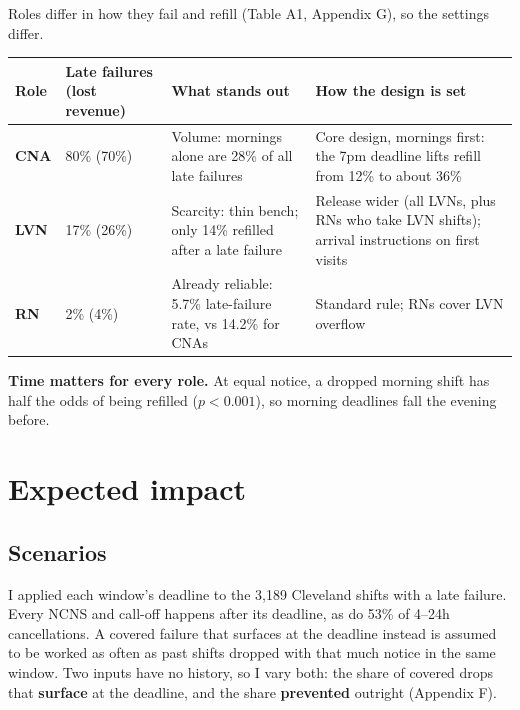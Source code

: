 \documentclass[11pt]{article}
\begin{document}
Roles differ in how they fail and refill (Table A1, Appendix G), so the settings differ.

\begin{center}\small
{}
\begin{tabularx}{\textwidth}{@{}lR{2.0cm}LL@{}}
\toprule
Role & Late failures (lost revenue) & What stands out & How the design is set \\
\midrule
\textbf{CNA} & 80\% (70\%) & Volume: mornings alone are 28\% of all late failures & Core design, mornings first: the 7pm
deadline lifts refill from 12\% to about 36\% \\
\textbf{LVN} & 17\% (26\%) & Scarcity: thin bench; only 14\% refilled after a late failure & Release wider (all LVNs,
plus RNs who take LVN shifts); arrival instructions on first visits \\
\textbf{RN} & 2\% (4\%) & Already reliable: 5.7\% late-failure rate, vs 14.2\% for CNAs & Standard rule; RNs cover LVN
overflow \\
\bottomrule
\end{tabularx}
\end{center}

\textbf{Time matters for every role.} At equal notice, a dropped morning shift has half the odds of being refilled
($p<0.001$), so morning deadlines fall the evening before.

\section{Expected impact}

\subsection{Scenarios}

I applied each window's deadline to the 3,189 Cleveland shifts with a late failure. Every NCNS and call-off happens after
its deadline, as do 53\% of 4--24h cancellations. A covered failure that surfaces at the deadline instead is assumed to
be worked as often as past shifts dropped with that much notice in the same window. Two inputs have no history, so I
vary both: the share of covered drops that \textbf{surface} at the deadline, and the share \textbf{prevented} outright
(Appendix F).
\end{document}
